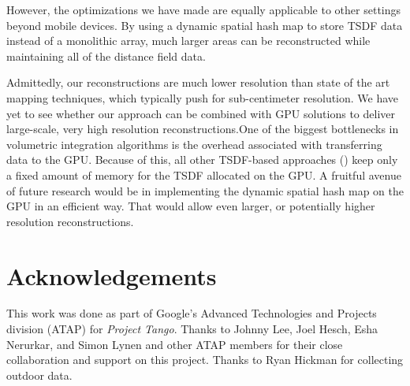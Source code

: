 \documentclass[10pt,twocolumn,letterpaper]{article}
\begin{document}
However, the optimizations we have made are equally applicable to other
settings beyond mobile devices. By using a dynamic spatial hash map to store
TSDF data instead of a monolithic array, much larger areas can be
reconstructed while maintaining all of the distance field data.

Admittedly, our reconstructions are much lower resolution than state of the art
mapping techniques, which typically push for sub-centimeter resolution. We have
yet to see whether our approach can be combined with GPU solutions to deliver
large-scale, very high resolution reconstructions.One of the biggest
bottlenecks in volumetric integration algorithms is the overhead associated
with transferring data to the GPU. Because of this, all other TSDF-based
approaches (\cite{Newcombe, Whelan2013, Bylow2013, Nguyen2012}) keep only a
fixed amount of memory for the TSDF allocated on the GPU. A fruitful avenue of
future research would be in implementing the dynamic spatial hash map on the GPU
in an efficient way. That would allow even larger, or potentially higher
resolution reconstructions.
% 
% 

\ifcvprfinal
\section*{Acknowledgements}
This work was done as part of Google's Advanced Technologies and Projects
division (ATAP) for \emph{Project Tango}. Thanks to Johnny Lee, Joel Hesch, Esha
Nerurkar, and Simon Lynen and other ATAP members for their close collaboration
and support on this project. Thanks to Ryan Hickman for collecting outdoor data.
\fi


 
\end{document}

